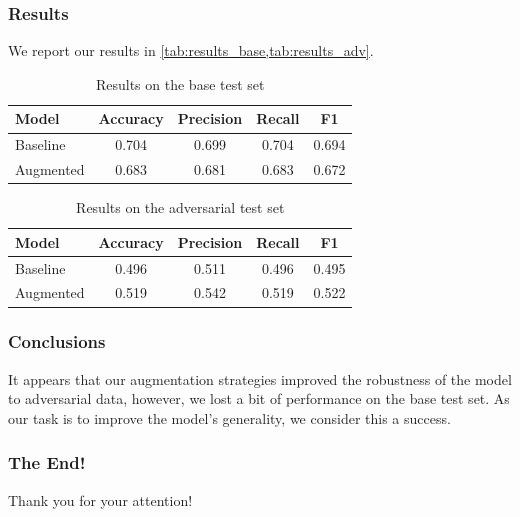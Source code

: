 \documentclass[english, xcolor={table,usenames}]{beamer}
\begin{document}
\begin{frame}
  \frametitle{Results}

  We report our results in \cref{tab:results_base,tab:results_adv}.

  \begin{table}[h]
    \centering
    \caption{Results on the base test set} \label{tab:results_base}
    \begin{tabularx}{0.90\linewidth}{|X|c|c|c|c|}
      \hline
      \textbf{Model} & \textbf{Accuracy} & \textbf{Precision} & \textbf{Recall} & \textbf{F1} \\
      \hline
      \hline
      Baseline       & 0.704             & 0.699              & 0.704           & 0.694       \\
      Augmented      & 0.683             & 0.681              & 0.683           & 0.672       \\
      \hline
    \end{tabularx}
  \end{table}

  \begin{table}[h]
    \centering
    \caption{Results on the adversarial test set} \label{tab:results_adv}
    \begin{tabularx}{0.90\linewidth}{|X|c|c|c|c|}
      \hline
      \textbf{Model} & \textbf{Accuracy} & \textbf{Precision} & \textbf{Recall} & \textbf{F1} \\
      \hline
      \hline
      Baseline       & 0.496             & 0.511              & 0.496           & 0.495       \\
      Augmented      & 0.519             & 0.542              & 0.519           & 0.522       \\
      \hline
    \end{tabularx}
  \end{table}
\end{frame}


\begin{frame}
  \frametitle{Conclusions}

  It appears that our augmentation strategies \alert{improved} the robustness of the model
  to adversarial data, however, we lost a bit of performance on the base test set. As our
  task is to improve the model's generality, we consider this a \alert{success}.

\end{frame}

\begin{frame}
  \frametitle{The End!}

  \centering
  \Huge{\alert{Thank you for your attention!}}

\end{frame}
\end{document}
